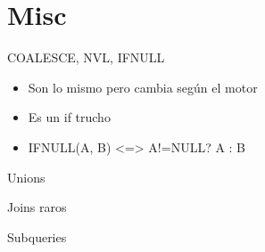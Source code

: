 \documentclass{beamer}
\begin{document}
\section{Misc}
\begin{frame}{COALESCE, NVL, IFNULL}
\begin{itemize}
	\item Son lo mismo pero cambia seg\'un el motor
	\item Es un if trucho
	\item IFNULL(A, B) <=> A!=NULL? A : B
\end{itemize}
\end{frame}

\begin{frame}{Unions}
\end{frame}

\begin{frame}{Joins raros}
\end{frame}

\begin{frame}{Subqueries}
\end{frame}
\end{document}
